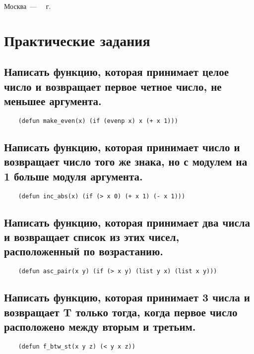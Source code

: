 \documentclass[12pt]{report}
\begin{document}
\begin{titlepage}
	\begin{center}
		\vfill
		Москва~---~\the\year
		~г.
	\end{center}
\end{titlepage}

\chapter{Практические задания}

\section{Написать функцию, которая принимает целое число и возвращает первое четное число, не меньшее аргумента.}

\begin{lstlisting}
	(defun make_even(x) (if (evenp x) x (+ x 1)))
\end{lstlisting}

\section{Написать функцию, которая принимает число и возвращает число того же знака, но с модулем на 1 больше модуля аргумента.}

\begin{lstlisting}
	(defun inc_abs(x) (if (> x 0) (+ x 1) (- x 1)))
\end{lstlisting}

\section{Написать функцию, которая принимает два числа и возвращает список из этих чисел, расположенный по возрастанию.}

\begin{lstlisting}
	(defun asc_pair(x y) (if (> x y) (list y x) (list x y)))
\end{lstlisting}
	
\section{Написать функцию, которая принимает 3 числа и возвращает T только тогда, когда первое число расположено между вторым и третьим.}	

\begin{lstlisting}
	(defun f_btw_st(x y z) (< y x z))
\end{lstlisting}
\end{document}
